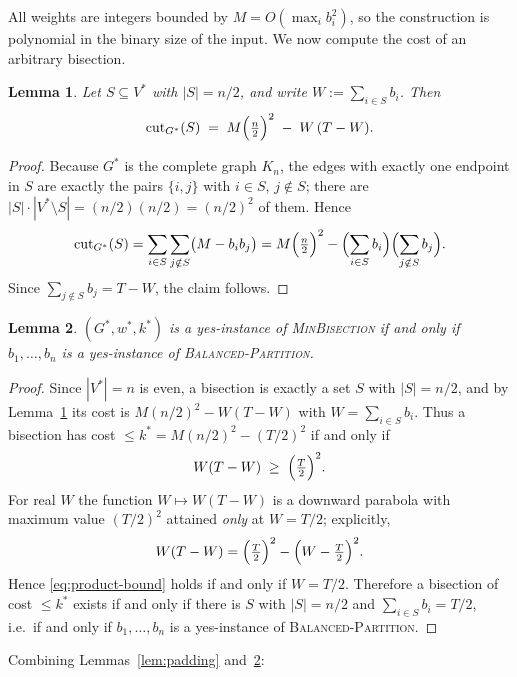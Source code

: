 \documentclass{amsart}
\theoremstyle{plain}
\newtheorem{lemma}{Lemma}
\theoremstyle{definition}
\theoremstyle{remark}
\newcommand{\cut}{\operatorname{cut}}
\begin{document}
All weights are integers bounded by $M=O(\max_i b_i^2)$, so the construction is
polynomial in the binary size of the input. We now compute the cost of an arbitrary
bisection.

\begin{lemma}\label{lem:Kn-cost}
Let $S\subseteq V^{\ast}$ with $|S|=n/2$, and write $W:=\sum_{i\in S} b_i$. Then
\[
  \cut_{G^{\ast}}(S) \;=\; M\Bigl(\tfrac{n}{2}\Bigr)^{2} \;-\; W\,(T-W).
\]
\end{lemma}

\begin{proof}
Because $G^{\ast}$ is the complete graph $K_n$, the edges with exactly one endpoint in
$S$ are exactly the pairs $\{i,j\}$ with $i\in S$, $j\notin S$; there are
$|S|\cdot|V^{\ast}\setminus S| = (n/2)(n/2)=(n/2)^2$ of them. Hence
\[
  \cut_{G^{\ast}}(S)
  =\sum_{i\in S}\sum_{j\notin S}\bigl(M-b_i b_j\bigr)
  =M\Bigl(\tfrac{n}{2}\Bigr)^{2}
   -\Bigl(\sum_{i\in S} b_i\Bigr)\Bigl(\sum_{j\notin S} b_j\Bigr).
\]
Since $\sum_{j\notin S} b_j = T-W$, the claim follows.
\end{proof}

\begin{lemma}\label{lem:Kn-correct}
$(G^{\ast},w^{\ast},k^{\ast})$ is a yes-instance of \textsc{MinBisection} if and only if
$b_1,\dots,b_n$ is a yes-instance of \textsc{Balanced-Partition}.
\end{lemma}

\begin{proof}
Since $|V^{\ast}|=n$ is even, a bisection is exactly a set $S$ with $|S|=n/2$, and by
Lemma~\ref{lem:Kn-cost} its cost is $M(n/2)^2 - W(T-W)$ with $W=\sum_{i\in S}b_i$.
Thus a bisection has cost $\le k^{\ast}=M(n/2)^2-(T/2)^2$ if and only if
\begin{equation}\label{eq:product-bound}
  W(T-W)\;\ge\;\Bigl(\tfrac{T}{2}\Bigr)^{2}.
\end{equation}
For real $W$ the function $W\mapsto W(T-W)$ is a downward parabola with maximum value
$(T/2)^2$ attained \emph{only} at $W=T/2$; explicitly,
\[
  W(T-W)=\Bigl(\tfrac{T}{2}\Bigr)^{2}-\Bigl(W-\tfrac{T}{2}\Bigr)^{2}.
\]
Hence \eqref{eq:product-bound} holds if and only if $W=T/2$. Therefore a bisection of
cost $\le k^{\ast}$ exists if and only if there is $S$ with $|S|=n/2$ and
$\sum_{i\in S} b_i=T/2$, i.e.\ if and only if $b_1,\dots,b_n$ is a yes-instance of
\textsc{Balanced-Partition}.
\end{proof}

Combining Lemmas~\ref{lem:padding} and~\ref{lem:Kn-correct}:
\end{document}
